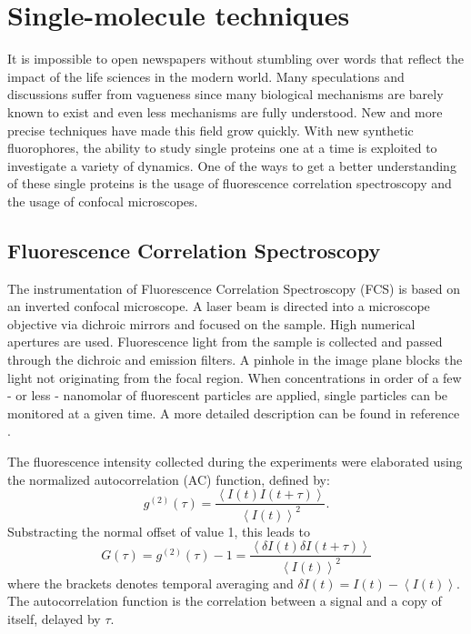 \documentclass[twoside,single]{lion-msc}
\begin{document}
\section{Single-molecule techniques}
It is impossible to open newspapers without stumbling over words that reflect the impact of the life sciences in the modern world. Many speculations and discussions suffer from vagueness since many biological mechanisms are barely known to exist and even less mechanisms are fully understood. New and more precise techniques have made this field grow quickly. With new synthetic fluorophores, the ability to study single proteins one at a time is exploited to investigate a variety of dynamics.  One of the ways to get a better understanding of these single proteins is the usage of fluorescence correlation spectroscopy and the usage of confocal microscopes. 

\subsection{Fluorescence Correlation Spectroscopy}
The instrumentation of Fluorescence Correlation Spectroscopy (FCS) is based on an inverted confocal microscope.  A laser beam is directed into a microscope objective via dichroic mirrors and focused on the sample. High numerical apertures are used. Fluorescence light from the sample is collected and passed through the dichroic and emission filters. A pinhole in the image plane blocks the light not originating from the focal region. When concentrations in order of a few - or less - nanomolar of fluorescent particles are applied, single particles can be monitored at a given time. A more detailed description can be found in reference \cite{Schwille}.

The fluorescence intensity collected during the experiments were elaborated using the normalized autocorrelation (AC) function, defined by:
\begin{equation}
g^{(2)}(\tau) = \frac{\left \langle I(t)I(t + \tau) \right \rangle}{\left \langle I(t)\right \rangle ^{2}}.
\end{equation}
Substracting the normal offset of value 1, this leads to
\begin{equation} \label{AC}
G(\tau) = g^{(2)}(\tau) - 1 =  \frac{\left \langle \delta I(t)\delta I(t + \tau) \right \rangle}{\left \langle I(t)\right \rangle ^{2}}
\end{equation}
where the brackets  denotes temporal averaging and $\delta I(t) = I(t) - \left \langle I(t)\right \rangle$. The autocorrelation function is the correlation between a signal and a copy of itself,  delayed by $\tau$.
\end{document}
